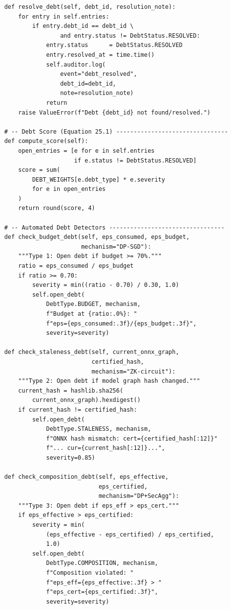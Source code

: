 \begin{lstlisting}
    def resolve_debt(self, debt_id, resolution_note):
        for entry in self.entries:
            if entry.debt_id == debt_id \
                    and entry.status != DebtStatus.RESOLVED:
                entry.status      = DebtStatus.RESOLVED
                entry.resolved_at = time.time()
                self.auditor.log(
                    event="debt_resolved",
                    debt_id=debt_id,
                    note=resolution_note)
                return
        raise ValueError(f"Debt {debt_id} not found/resolved.")

    # -- Debt Score (Equation 25.1) --------------------------------
    def compute_score(self):
        open_entries = [e for e in self.entries
                        if e.status != DebtStatus.RESOLVED]
        score = sum(
            DEBT_WEIGHTS[e.debt_type] * e.severity
            for e in open_entries
        )
        return round(score, 4)

    # -- Automated Debt Detectors ---------------------------------
    def check_budget_debt(self, eps_consumed, eps_budget,
                          mechanism="DP-SGD"):
        """Type 1: Open debt if budget >= 70%."""
        ratio = eps_consumed / eps_budget
        if ratio >= 0.70:
            severity = min((ratio - 0.70) / 0.30, 1.0)
            self.open_debt(
                DebtType.BUDGET, mechanism,
                f"Budget at {ratio:.0%}: "
                f"eps={eps_consumed:.3f}/{eps_budget:.3f}",
                severity=severity)

    def check_staleness_debt(self, current_onnx_graph,
                             certified_hash,
                             mechanism="ZK-circuit"):
        """Type 2: Open debt if model graph hash changed."""
        current_hash = hashlib.sha256(
            current_onnx_graph).hexdigest()
        if current_hash != certified_hash:
            self.open_debt(
                DebtType.STALENESS, mechanism,
                f"ONNX hash mismatch: cert={certified_hash[:12]}"
                f"... cur={current_hash[:12]}...",
                severity=0.85)

    def check_composition_debt(self, eps_effective,
                               eps_certified,
                               mechanism="DP+SecAgg"):
        """Type 3: Open debt if eps_eff > eps_cert."""
        if eps_effective > eps_certified:
            severity = min(
                (eps_effective - eps_certified) / eps_certified,
                1.0)
            self.open_debt(
                DebtType.COMPOSITION, mechanism,
                f"Composition violated: "
                f"eps_eff={eps_effective:.3f} > "
                f"eps_cert={eps_certified:.3f}",
                severity=severity)


\end{lstlisting}
